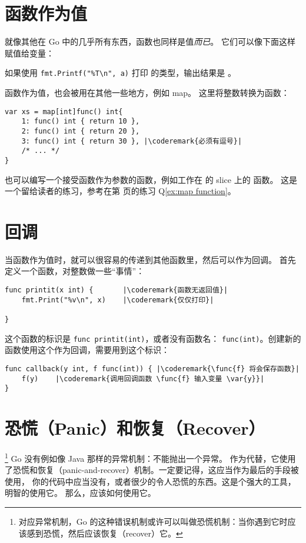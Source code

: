 \section{函数作为值}
\label{sec:functions as values}
就像其他在 Go 中的几乎所有东西，函数也同样是值\emph{而已}。
它们可以像下面这样赋值给变量：

如果使用 \lstinline{fmt.Printf("%T\n", a)} 打印  的类型，输出结果是 。

函数作为值，也会被用在其他一些地方，例如 map。
这里将整数转换为函数：
\begin{lstlisting}[caption=使用 map 的函数作为值]
var xs = map[int]func() int{
    1: func() int { return 10 },
    2: func() int { return 20 },
    3: func() int { return 30 }, |\coderemark{必须有逗号}|
    /* ... */
}
\end{lstlisting}
也可以编写一个接受函数作为参数的函数，例如工作在  的 slice 上的  函数。
这是一个留给读者的练习，参考在第 \pageref{ex:map function} 页的练习 Q\ref{ex:map function}。

\section{回调}
\label{sec:callbacks}
当函数作为值时，就可以很容易的传递到其他函数里，然后可以作为回调。
首先定义一个函数，对整数做一些``事情''：
\begin{lstlisting}
func printit(x int) {       |\coderemark{函数无返回值}|
    fmt.Print("%v\n", x)    |\coderemark{仅仅打印}|

}
\end{lstlisting}
这个函数的标识是 \lstinline{func printit(int)}，或者没有函数名：
\mbox{\lstinline{func(int)}}。创建新的函数使用这个作为回调，需要用到这个标识：
\begin{lstlisting}
func callback(y int, f func(int)) { |\coderemark{\func{f} 将会保存函数}|
    f(y)    |\coderemark{调用回调函数 \func{f} 输入变量 \var{y}}|
}
\end{lstlisting}

\section{恐慌（Panic）和恢复（Recover）}
\label{sec:panic}
\footnote{对应异常机制，Go 的这种错误机制或许可以叫做恐慌机制：当你遇到它时应该感到恐慌，然后应该恢复（recover）它。}
Go 没有例如像 Java 那样的异常机制：不能抛出一个异常。
作为代替，它使用了恐慌和恢复（panic-and-recover）机制。一定要记得，这应当作为最后的手段被使用，
你的代码中应当没有，或者很少的令人恐慌的东西。这是个强大的工具，明智的使用它。
那么，应该如何使用它。

